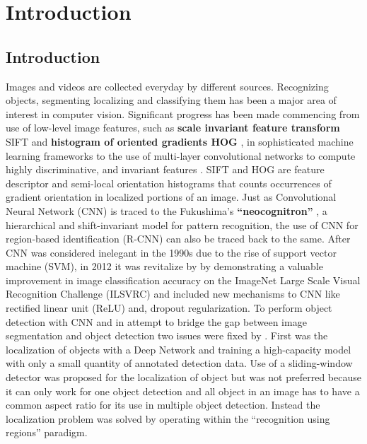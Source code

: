 
\chapter{Introduction}\label{ch:INTRO}



\section{Introduction}\label{sec:INTRO:ml}

Images and videos are collected everyday by different sources. Recognizing objects, segmenting localizing and classifying them has been a major area of interest in computer vision. Significant progress has been made commencing from use of low-level image features, such as \textbf {scale invariant feature transform}  SIFT \protect\cite{A} and \textbf{ histogram of oriented gradients HOG }\protect\cite{B} , in sophisticated machine learning frameworks to the use of multi-layer convolutional networks to compute highly discriminative, and invariant features \protect\cite{C}. SIFT and HOG are feature descriptor and semi-local orientation histograms that counts occurrences of gradient orientation in localized portions of an image. Just as Convolutional Neural Network (CNN) is traced to the Fukushima’s \textbf{ “neocognitron”} \protect\cite{D}, a hierarchical and shift-invariant model for pattern recognition, the use of CNN for region-based identification (R-CNN)\protect\cite{C} can also be traced back to the same.  After CNN was considered inelegant in the 1990s due to the rise of support vector machine (SVM), in 2012 it was revitalize by  \protect\cite{D} by demonstrating a valuable improvement in image classification accuracy on the ImageNet Large Scale Visual Recognition Challenge (ILSVRC) \protect\cite{E} and included new mechanisms to CNN like rectified linear unit (ReLU) and, dropout regularization. To perform object detection with CNN and in attempt to bridge the gap between image segmentation and object detection two issues were fixed by \protect\cite{C}. First was the localization of objects with a Deep Network and training a high-capacity model with only a small quantity of annotated detection
data. Use of a sliding-window detector was proposed for the localization of object but was not preferred because it can only work for one object detection and all object in an image has to have a common aspect ratio for its use in multiple object detection. Instead the localization problem was solved by operating within the “recognition using regions” paradigm.

